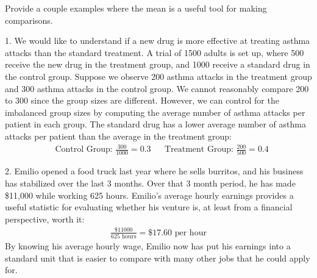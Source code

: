 \begin{example}{Provide a couple examples where the mean
  is a useful tool for making comparisons.}

  1. We would like to understand if a new drug is more
  effective at treating asthma attacks than the standard
  treatment.
  A trial of 1500 adults is set up,
  where 500 receive the new drug in the treatment group,
  and 1000 receive a standard drug in the control group.
  Suppose we observe 200 asthma attacks in the treatment
  group and 300 asthma attacks in the control group.
  We cannot reasonably compare 200 to 300
  since the group sizes are different.
  However, we can control for the imbalanced group sizes
  by computing the average number of asthma attacks per
  patient in each group.
  The standard drug has a lower
  average number of asthma attacks per patient %
  than the average in the treatment group: %
  \begin{align*}
  & \text{Control Group: }\frac{300}{1000} = 0.3
      && \text{Treatment Group: } \frac{200}{500} = 0.4 %
  \end{align*}

  2. Emilio opened a food truck last year where he sells burritos,
  and his business has stabilized over the last 3 months.
  Over that 3 month period, he has made \$11,000 while
  working 625 hours.
  Emilio's average hourly earnings provides
  a useful statistic for evaluating whether his venture is,
  at least from a financial perspective, worth it:
  \begin{align*}
  \frac{\$11000}{625\text{ hours}} = \$17.60\text{ per hour}
  \end{align*}
  By knowing his average hourly wage,
  Emilio now has put his earnings into a standard unit that
  is easier to compare with many other jobs that he could
  apply for.
\end{example}

